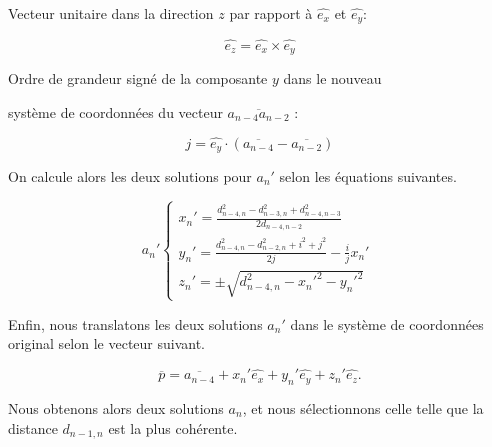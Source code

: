 \centerline{Vecteur unitaire dans la direction $z$ par rapport à $\hat{e_x}$ et $\hat{e_y}$:}
\[
\hat{e_z} = \hat{e_x}\times\hat{e_y}
\]

\vspace{0.4cm}

\centerline{Ordre de grandeur signé de la composante $y$ dans le nouveau}
\centerline{ système de coordonnées du vecteur $\overline{a_{n-4}a_{n-2}}$ : }
\[
j = \hat{e_y}\cdot(\overline{a_{n-4}}-\overline{a_{n-2}})
\]

\vspace{0.4cm}
\par On calcule alors les deux solutions pour $a_n'$ selon les équations suivantes.

\vspace{0.4cm}

\[
a_{n}'\left \{
   	\begin{array}{l}
      x_{n}'= \frac{d_{n-4,n}^2 - d_{n-3,n}^2 + d_{n-4,n-3}^2}{2d_{n-4,n-2}}\\
      y_{n}'= \frac{d_{n-4,n}^2 - d_{n-2,n}^2 + i^2 + j^2}{2j}-\frac{i}{j}x_{n}'\\
	  z_{n}'= \pm\sqrt{d_{n-4,n}^2 - x_{n}'^2 - y_{n}'^2}
   	\end{array}
   	\right .
   	\:
\]

\vspace{0.4cm}

\par Enfin, nous translatons les deux solutions $a_n'$ dans le système de coordonnées original selon le vecteur suivant.

\[
\overline{p} = \overline{a_{n-4}} + x_{n}'\hat{e_x} + y_{n}'\hat{e_y} + z_{n}'\hat{e_z}.
\]

\vspace{0.4cm}

Nous obtenons alors deux solutions $a_n$, et nous sélectionnons celle telle que la distance $d_{n-1,n}$ est la plus cohérente.


